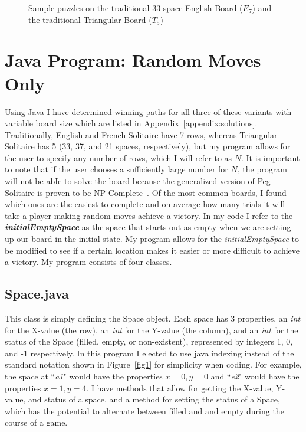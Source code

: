 \documentclass{article}
\begin{document}
\begin{figure}[htb]
\centering
{}
\caption{Sample puzzles on the traditional 33 space English Board ($E_7$) and the traditional Triangular Board ($T_5$)}
\label{fig2}
\end{figure}

\section{Java Program: Random Moves Only}
Using Java I have determined winning paths for all three of these variants with variable board size which are listed in Appendix~\ref{appendix:solutions}. Traditionally, English and French Solitaire have 7 rows, whereas Triangular Solitaire has 5 (33, 37, and 21 spaces, respectively), but my program allows for the user to specify any number of rows, which I will refer to as \textbf{$N$}. It is important to note that if the user chooses a sufficiently large number for $N$, the program will not be abIe to solve the board because the generalized version of Peg Solitaire is proven to be NP-Complete~\cite{Uehara}. Of the most common boards, I found which ones are the easiest to complete and on average how many trials it will take a player making random moves achieve a victory. In my code I refer to the \textbf{\textit{initialEmptySpace}} as the space that starts out as empty when we are setting up our board in the initial state. My program allows for the \textit{initialEmptySpace} to be modified to see if a certain location makes it easier or more difficult to achieve a victory. My program consists of four classes.

\subsection{Space.java}
This class is simply defining the Space object. Each space has 3 properties, an \textit{int} for the X-value (the row), an \textit{int} for the Y-value (the column), and an \textit{int} for the status of the Space (filled, empty, or non-existent), represented by integers 1, 0, and -1 respectively. In this program I elected to use java indexing instead of the standard notation shown in  Figure~\ref{fig1} for simplicity when coding. For example, the space at ``\textit{a1}" would have the properties $x=0, y=0$ and ``\textit{e2}" would have the properties $x=1,y=4$. I have methods that allow for getting the X-value, Y-value, and status of a space, and a method for setting the status of a Space, which has the potential to alternate between filled and and empty during the course of a game.
\end{document}
